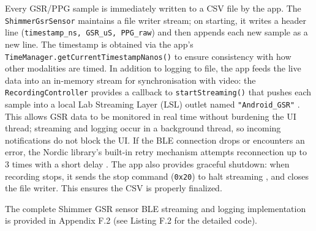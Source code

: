 Every GSR/PPG sample is immediately written to a CSV file by the app. The \texttt{ShimmerGsrSensor} maintains a file writer stream; on starting, it writes a header line (\texttt{timestamp\_ns, GSR\_uS, PPG\_raw}) and then appends each new sample as a new line. The timestamp is obtained via the app's \texttt{TimeManager.getCurrentTimestampNanos()} to ensure consistency with how other modalities are timed. In addition to logging to file, the app feeds the live data into an in-memory stream for synchronisation with video: the \texttt{RecordingController} provides a callback to \texttt{startStreaming()} that pushes each sample into a local Lab Streaming Layer (LSL) outlet named \texttt{"Android\_GSR"} \citep{ref9}. This allows GSR data to be monitored in real time without burdening the UI thread; streaming and logging occur in a background thread, so incoming notifications do not block the UI. If the BLE connection drops or encounters an error, the Nordic library's built-in retry mechanism attempts reconnection up to 3 times with a short delay \citep{ref14}. The app also provides graceful shutdown: when recording stops, it sends the stop command (\texttt{0x20}) to halt streaming \citep{ref15}, and closes the file writer. This ensures the CSV is properly finalized.

The complete Shimmer GSR sensor BLE streaming and logging implementation is provided in Appendix F.2 (see Listing F.2 for the detailed code).

